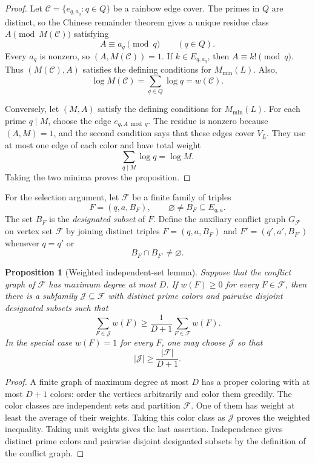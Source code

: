\documentclass[11pt]{amsart}
\newtheorem{proposition}[theorem]{Proposition}
\theoremstyle{definition}
\theoremstyle{remark}
\begin{document}
\begin{proof}
Let $\mathcal C=\{e_{q,a_q}:q\in Q\}$ be a rainbow edge cover.  The primes
in $Q$ are distinct, so the Chinese remainder theorem gives a unique residue class
$A\pmod {M(\mathcal C)}$ satisfying
\[
A\equiv a_q\pmod q\qquad(q\in Q).
\]
Every $a_q$ is nonzero, so $(A,M(\mathcal C))=1$.  If $k\in E_{q,a_q}$,
then $A\equiv k!\pmod q$.  Thus $(M(\mathcal C),A)$ satisfies the defining
conditions for $M_{\min}(L)$.  Also,
\[
\log M(\mathcal C)=\sum_{q\in Q}\log q
=w(\mathcal C).
\]

Conversely, let $(M,A)$ satisfy the defining conditions for $M_{\min}(L)$.
For each prime $q\mid M$, choose the edge $e_{q,A\bmod q}$.  The residue is
nonzero because $(A,M)=1$, and the second condition says that these edges
cover $V_L$.  They use at most one edge of each color and have total weight
\[
\sum_{q\mid M}\log q=\log M.
\]
Taking the two minima proves the proposition.
\end{proof}

For the selection argument, let $\mathcal F$ be a finite family of triples
\[
F=(q,a,B_F),
\qquad
\varnothing\neq B_F\subseteq E_{q,a}.
\]
The set $B_F$ is the \emph{designated subset} of $F$.  Define the auxiliary
conflict graph $G_{\mathcal F}$ on vertex set $\mathcal F$ by joining
distinct triples $F=(q,a,B_F)$ and $F'=(q',a',B_{F'})$ whenever $q=q'$ or
\[
B_F\cap B_{F'}\neq\varnothing.
\]

\begin{proposition}[Weighted independent-set lemma]
\label{prop:conflict-selection}
Suppose that the conflict graph of $\mathcal F$ has maximum degree at most
$D$.  If $w(F)\geq0$ for every $F\in\mathcal F$, then there is a subfamily
$\mathcal J\subseteq\mathcal F$ with distinct prime colors and pairwise
disjoint designated subsets such that
\[
\sum_{F\in\mathcal J}w(F)
\geq\frac1{D+1}\sum_{F\in\mathcal F}w(F).
\]
In the special case $w(F)=1$ for every $F$, one may choose $\mathcal J$ so
that
\[
|\mathcal J|\geq\frac{|\mathcal F|}{D+1}.
\]
\end{proposition}

\begin{proof}
A finite graph of maximum degree at most $D$ has a proper coloring with at
most $D+1$ colors: order the vertices arbitrarily and color them greedily.
The color classes are independent sets and partition $\mathcal F$.  One of
them has weight at least the average of their weights.  Taking this color
class as $\mathcal J$ proves the weighted inequality.  Taking unit weights
gives the last assertion.  Independence gives distinct prime colors and
pairwise disjoint designated subsets by the definition of the conflict graph.
\end{proof}
\end{document}
